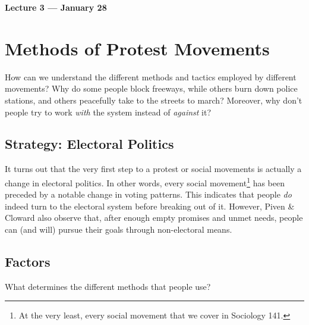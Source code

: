 \newpage
\noindent \textbf{Lecture 3 --- January 28\th}



\section{Methods of Protest Movements}
How can we understand the different methods and tactics employed by different movements?
Why do some people block freeways, while others burn down police stations, and others peacefully take to the streets to march?
Moreover, why don't people try to work \textit{with} the system instead of \textit{against} it?

\subsection{Strategy: Electoral Politics}
It turns out that the very first step to a protest or social movements is actually a change in electoral politics.
In other words, every social movement\footnote{At the very least, every social movement that we cover in Sociology 141.} has been preceded by a notable change in voting patterns.
This indicates that people \textit{do} indeed turn to the electoral system before breaking out of it.
However, Piven \& Cloward also observe that, after enough empty promises and unmet needs, people can (and will) pursue their goals through non-electoral means.

\subsection{Factors}
What determines the different methods that people use?

